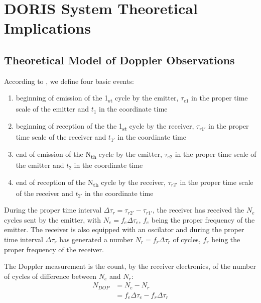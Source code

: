 \chapter{DORIS System Theoretical Implications}
\label{ch:doris-theory}

\section{Theoretical Model of Doppler Observations}
According to \cite{lemoine-2016}, we define four basic events:
\begin{enumerate}
    \item beginning of emission of the 1\textsubscript{st} cycle by the emitter, 
    \(\tau_{e1}\) in the proper time scale of the emitter and \(t_1\) in the coordinate 
    time
    
    \item beginning of reception of the the 1\textsubscript{st} cycle by the receiver, 
    \(\tau_{r1'}\) in the proper time scale of the receiver and 
    \(t_{1'}\) in the coordinate time

    \item end of emission of the N\textsubscript{th} cycle by the emitter, 
    \(\tau_{e2}\) in the proper time scale of the emitter and \(t_2\) in the coordinate 
    time
    
    \item end of reception of the N\textsubscript{th} cycle by the receiver, 
    \(\tau_{r2'}\) in the proper time scale of the receiver and 
    \(t_{2'}\) in the coordinate time
\end{enumerate}

During the proper time interval \(\Delta\tau_{r} = \tau_{r2'} - \tau_{r1'}\), 
the receiver has received the \(N_e\) cycles sent by the emitter, with \(N_e = f_e \Delta\tau_e\), 
\(f_e\) being the proper frequency of the emitter. The receiver is also equipped with
an oscilator and during the proper time interval \(\Delta\tau_{r}\) has generated 
a number \(N_r = f_r \Delta\tau_r\) of cycles, \(f_r\) being the proper frequency of the 
receiver.

The Doppler measurement is the count, by the receiver electronics, of the number 
of cycles of difference between \(N_e\) and \(N_r\):
\begin{equation}
    \begin{split}
    N_{DOP} & = N_e - N_r\\
            & = f_e \Delta\tau_e - f_r \Delta\tau_r
    \end{split}
\end{equation}

